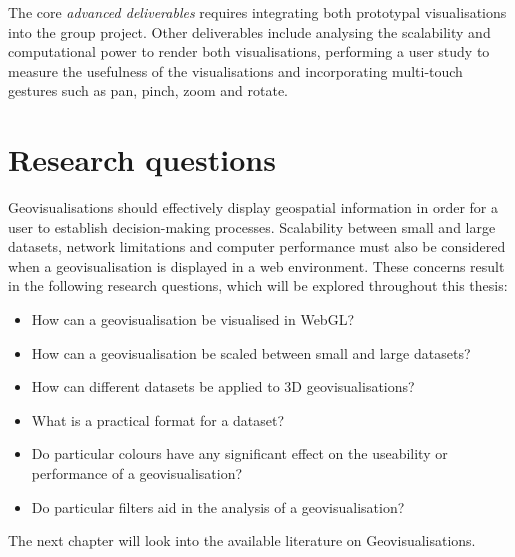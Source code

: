 {	The core \emph{advanced deliverables} requires integrating both prototypal visualisations into the group project. Other deliverables include analysing the scalability and computational power to render both visualisations, performing a user study to measure the usefulness of the visualisations and incorporating multi-touch gestures such as pan, pinch, zoom and rotate.
	
}

\section{Research questions} {
\label{sec:research_questions}

	Geovisualisations should effectively display geospatial information in order for a user to establish decision-making processes. Scalability between small and large datasets, network limitations and computer performance must also be considered when a geovisualisation is displayed in a web environment. These concerns result in the following research questions, which will be explored throughout this thesis:

	\begin{itemize}
		\item How can a geovisualisation be visualised in WebGL?
		\item How can a geovisualisation be scaled between small and large datasets?
		\item How can different datasets be applied to 3D geovisualisations?
		\item What is a practical format for a dataset?
		\item Do particular colours have any significant effect on the useability or performance of a geovisualisation?
		\item Do particular filters aid in the analysis of a geovisualisation?
	\end{itemize}

}

The next chapter will look into the available literature on Geovisualisations.